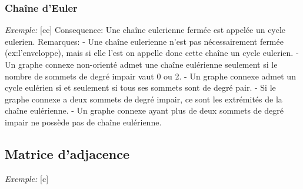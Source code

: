 \documentclass[12pt]{article}
\begin{document}
        \subsubsection{Chaîne d'Euler}
            \textit{Exemple:}
            [cc]
            Consequence:
            Une chaîne eulerienne fermée est appelée un cycle eulerien.
            Remarques:
            - Une chaîne eulerienne n'est pas nécessairement fermée (ex:l'enveloppe), mais si elle l'est on appelle donc cette chaîne un cycle eulerien.
            - Un graphe connexe non-orienté admet une chaîne eulérienne seulement si le nombre de sommets de degré impair vaut 0 ou 2.
            - Un graphe connexe admet un cycle eulérien si et seulement si tous ses sommets sont de degré pair.
            - Si le graphe connexe a deux sommets de degré impair, ce sont les extrémités de la chaîne eulérienne.
            - Un graphe connexe ayant plus de deux sommets de degré impair ne possède pas de chaîne eulérienne.

    \subsection{Matrice d'adjacence}
        \textit{Exemple:}
        [c]

    \egroup
\end{document}
